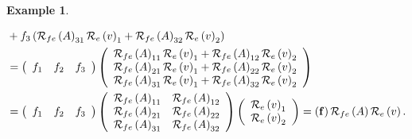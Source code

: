 \documentclass[aps,preprint]{revtex4}%
\newtheorem{example}[theorem]{Example}
\begin{document}
\begin{example}
\begin{enumerate}
\begin{align}
&  +f_{3}\left(  \mathcal{R}_{fe}\left(  A\right)  _{31}\mathcal{R}_{e}\left(
v\right)  _{1}+\mathcal{R}_{fe}\left(  A\right)  _{32}\mathcal{R}_{e}\left(
v\right)  _{2}\right) \\
&  =\left(
\begin{array}
[c]{ccc}%
f_{1} & f_{2} & f_{3}%
\end{array}
\right)  \left(
\begin{array}
[c]{c}%
\mathcal{R}_{fe}\left(  A\right)  _{11}\mathcal{R}_{e}\left(  v\right)
_{1}+\mathcal{R}_{fe}\left(  A\right)  _{12}\mathcal{R}_{e}\left(  v\right)
_{2}\\
\mathcal{R}_{fe}\left(  A\right)  _{21}\mathcal{R}_{e}\left(  v\right)
_{1}+\mathcal{R}_{fe}\left(  A\right)  _{22}\mathcal{R}_{e}\left(  v\right)
_{2}\\
\mathcal{R}_{fe}\left(  A\right)  _{31}\mathcal{R}_{e}\left(  v\right)
_{1}+\mathcal{R}_{fe}\left(  A\right)  _{32}\mathcal{R}_{e}\left(  v\right)
_{2}%
\end{array}
\right) \\
&  =\left(
\begin{array}
[c]{ccc}%
f_{1} & f_{2} & f_{3}%
\end{array}
\right)  \left(
\begin{array}
[c]{cc}%
\mathcal{R}_{fe}\left(  A\right)  _{11} & \mathcal{R}_{fe}\left(  A\right)
_{12}\\
\mathcal{R}_{fe}\left(  A\right)  _{21} & \mathcal{R}_{fe}\left(  A\right)
_{22}\\
\mathcal{R}_{fe}\left(  A\right)  _{31} & \mathcal{R}_{fe}\left(  A\right)
_{32}%
\end{array}
\right)  \left(
\begin{array}
[c]{c}%
\mathcal{R}_{e}\left(  v\right)  _{1}\\
\mathcal{R}_{e}\left(  v\right)  _{2}%
\end{array}
\right)  =\left(  \mathbf{f}\right)  \mathcal{R}_{fe}\left(  A\right)
\mathcal{R}_{e}\left(  v\right)  .
\end{align}



\end{enumerate}
\end{example}
\end{document}
